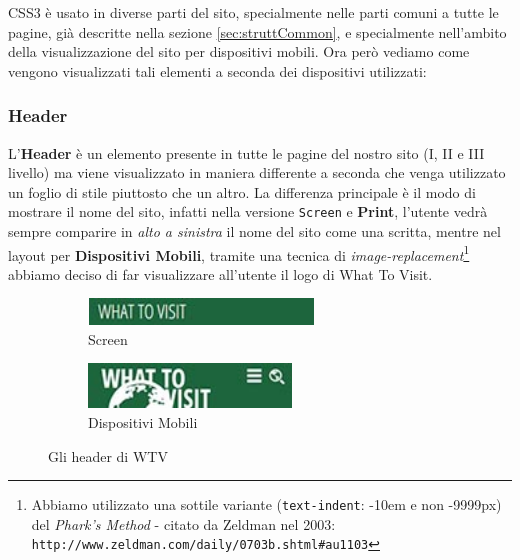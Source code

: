 CSS3 è usato in diverse parti del sito, specialmente nelle parti comuni a
tutte le pagine, già descritte nella sezione \ref{sec:struttCommon}, e
specialmente nell'ambito della visualizzazione del sito per dispositivi
mobili. Ora però vediamo come vengono visualizzati tali elementi a seconda dei
dispositivi utilizzati:

\subsubsection{Header}\label{sec:Pres-Header}
L'\textbf{Header} è un elemento presente in tutte le pagine del nostro sito
(I, II e III livello) ma viene visualizzato in maniera differente a seconda
che venga utilizzato un foglio di stile piuttosto che un altro. La differenza
principale è il modo di mostrare il nome del sito, infatti nella versione
\texttt{Screen} e \textbf{Print}, l'utente vedrà sempre comparire in
\textit{alto a sinistra} il nome del sito come una scritta, mentre nel layout
per \textbf{Dispositivi Mobili}, tramite una tecnica di
\textit{image-replacement}\footnote{Abbiamo utilizzato una sottile variante
(\texttt{text-indent}: -10em e non -9999px) del
\textit{Phark's Method} - citato da Zeldman nel 2003:
\texttt{http://www.zeldman.com/daily/0703b.shtml\#au1103}} abbiamo deciso di
far visualizzare all'utente il logo di What To Visit.
\begin{figure}[h!]
  \centering
  \begin{subfigure}[b]{0.3\textwidth}
    \includegraphics[height=0.7cm,width=6cm]{images/pres_header.jpg}
    \caption{Screen}
    \label{fig:Header-screen}
  \end{subfigure}
  \hspace{3cm}
  \begin{subfigure}[b]{0.3\textwidth}
    \includegraphics[height=1.2cm,width=5.4cm]{images/pres_header_m.jpg}
    \caption{Dispositivi Mobili}
    \label{fig:Header-mobile}
  \end{subfigure}
  \caption{Gli header di WTV}\label{fig:Display-Header}
\end{figure}

